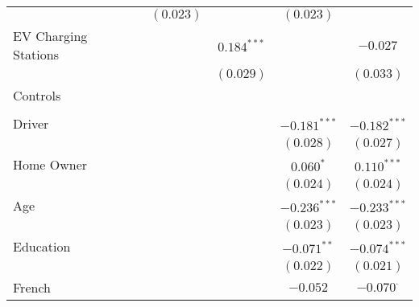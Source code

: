 \begin{center}
\begin{tiny}
\begin{longtable}{l@{} c@{} c@{} c@{} c@{} c@{}}
                                                      &                & $(0.023)$        &                & $(0.023)$        &                  \\
\quad EV Charging Stations                            &                &                  & $0.184^{***}$  &                  & $-0.027$         \\
                                                      &                &                  & $(0.029)$      &                  & $(0.033)$        \\
Controls                                              &                &                  &                &                  &                  \\
                                                      &                &                  &                &                  &                  \\
\quad Driver                                          &                &                  &                & $-0.181^{***}$   & $-0.182^{***}$   \\
                                                      &                &                  &                & $(0.028)$        & $(0.027)$        \\
\quad Home Owner                                      &                &                  &                & $0.060^{*}$      & $0.110^{***}$    \\
                                                      &                &                  &                & $(0.024)$        & $(0.024)$        \\
\quad Age                                             &                &                  &                & $-0.236^{***}$   & $-0.233^{***}$   \\
                                                      &                &                  &                & $(0.023)$        & $(0.023)$        \\
\quad Education                                       &                &                  &                & $-0.071^{**}$    & $-0.074^{***}$   \\
                                                      &                &                  &                & $(0.022)$        & $(0.021)$        \\
\quad French                                          &                &                  &                & $-0.052$         & $-0.070^{\cdot}$ \\

\end{longtable}
\end{tiny}
\end{center}

